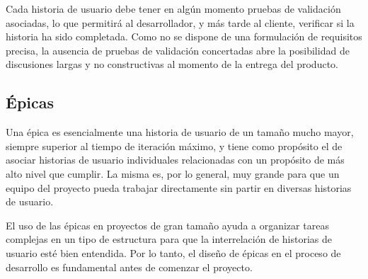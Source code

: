 Cada historia de usuario debe tener en algún momento pruebas de validación asociadas, lo que permitirá al desarrollador, y más tarde al cliente, verificar si la historia ha sido completada. Como no se dispone de una formulación de requisitos precisa, la ausencia de pruebas de validación concertadas abre la posibilidad de discusiones largas y no constructivas al momento de la entrega del producto.

\subsection{Épicas}
Una épica es esencialmente una historia de usuario de un tamaño mucho mayor, siempre superior al tiempo de iteración máximo, y tiene como propósito el de asociar historias de usuario individuales relacionadas con un propósito de más alto nivel que cumplir. La misma es, por lo general, muy grande para que un equipo del proyecto pueda trabajar directamente sin partir en diversas historias de usuario\citep{cobb2015project}.

El uso de las épicas en proyectos de gran tamaño ayuda a organizar tareas complejas en un tipo de estructura para que la interrelación de historias de usuario esté bien entendida. Por lo tanto, el diseño de épicas en el proceso de desarrollo es fundamental antes de comenzar el proyecto.